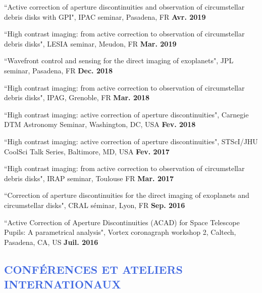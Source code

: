 \documentclass[11pt,a4paper, french]{article}
\begin{document}
\begin{etaremune}
\item ``Active correction of aperture discontinuities and observation of circumstellar debris disks with GPI", IPAC seminar, Pasadena, FR \textbf{Avr. 2019}

\item ``High contrast imaging: from active correction to observation of circumstellar debris disks", LESIA seminar, Meudon, FR \textbf{Mar. 2019}

\item ``Wavefront control and sensing for the direct imaging of exoplanets", JPL seminar, Pasadena, FR \textbf{Dec. 2018}

\item ``High contrast imaging: from active correction to observation of circumstellar debris disks", IPAG, Grenoble, FR \textbf{Mar. 2018}

\item ``High contrast imaging: active correction of aperture discontinuities", Carnegie DTM Astronomy Seminar, Washington, DC, USA \textbf{Fev. 2018}

\item ``High contrast imaging: active correction of aperture discontinuities", STScI/JHU CoolSci Talk Series, Baltimore, MD, USA \textbf{Fev. 2017}

\item ``High contrast imaging: from active correction to observation of circumstellar debris disks", IRAP seminar, Toulouse FR \textbf{Mar. 2017}

\item ``Correction of aperture discontinuities for the direct imaging of exoplanets and circumstellar disks", CRAL séminar, Lyon, FR \textbf{Sep. 2016}

\item ``Active Correction of Aperture Discontinuities (ACAD) for Space Telescope Pupils: A parametrical analysis", Vortex coronagraph workshop 2, Caltech, Pasadena, CA, US \textbf{Juil. 2016}
\end{etaremune}

\vspace{-0.8cm}
\textcolor{RoyalBlue}{\subsection{\large CONFÉRENCES ET ATELIERS INTERNATIONAUX}}
\end{document}
